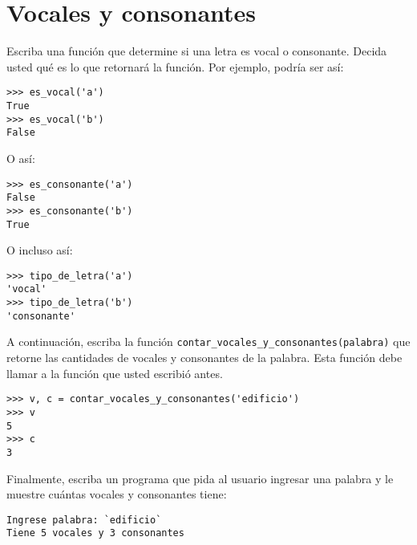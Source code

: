 \section{Vocales y consonantes}

Escriba una función que determine si una letra es vocal o consonante.
Decida usted qué es lo que retornará la función. Por ejemplo, podría ser
así:
%
\begin{lstlisting}
>>> es_vocal('a')
True
>>> es_vocal('b')
False
\end{lstlisting}
%
O así:
%
\begin{lstlisting}
>>> es_consonante('a')
False
>>> es_consonante('b')
True
\end{lstlisting}
%
O incluso así:
%
\begin{lstlisting}
>>> tipo_de_letra('a')
'vocal'
>>> tipo_de_letra('b')
'consonante'
\end{lstlisting}

A continuación, escriba la función
\lstinline!contar_vocales_y_consonantes(palabra)! que retorne las
cantidades de vocales y consonantes de la palabra. Esta función debe
llamar a la función que usted escribió antes.

\begin{lstlisting}
>>> v, c = contar_vocales_y_consonantes('edificio')
>>> v
5
>>> c
3
\end{lstlisting}

Finalmente, escriba un programa que pida al usuario ingresar una palabra
y le muestre cuántas vocales y consonantes tiene:
%
\begin{lstlisting}[language=testcase]
Ingrese palabra: `edificio`
Tiene 5 vocales y 3 consonantes
\end{lstlisting}
